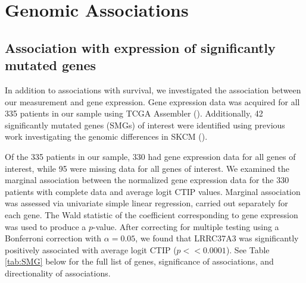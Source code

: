 \documentclass[
]{book}
\begin{document}
\hypertarget{genomic-associations}{%
\chapter{Genomic Associations}\label{genomic-associations}}

\hypertarget{association-with-expression-of-significantly-mutated-genes}{%
\section{Association with expression of significantly mutated genes}\label{association-with-expression-of-significantly-mutated-genes}}

In addition to associations with survival, we investigated the
association between our measurement and gene expression. Gene
expression data was acquired for all 335 patients in
our sample using TCGA Assembler (\citet{Zhu14}). Additionally,
42 significantly mutated genes (SMGs) of interest were identified
using previous work investigating the genomic differences in
SKCM (\citet{Akbani15}).

Of the 335 patients in our sample, 330 had gene expression data
for all genes of interest, while 95 were missing data for all
genes of interest. We examined the marginal association between
the normalized gene expression data for the 330 patients with
complete data and average logit CTIP values. Marginal association
was assessed via univariate simple linear regression, carried out
separately for each gene. The Wald statistic of the coefficient
corresponding to gene expression was used to produce a \(p\)-value.
After correcting for multiple testing using a Bonferroni correction with \(\alpha = 0.05\), we found that LRRC37A3 was significantly positively associated with
average logit CTIP (\(p << 0.0001\)). See Table \ref{tab:SMG} below for the full list of genes, significance of associations, and directionality of associations.
\end{document}
